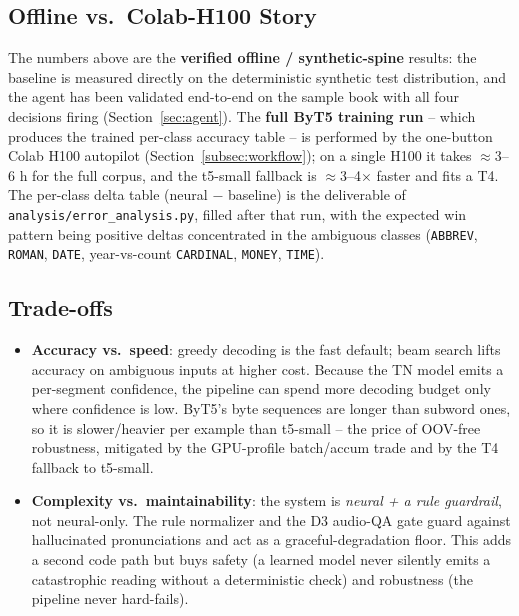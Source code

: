 \documentclass[12pt,a4paper]{article}
\begin{document}
\subsection{Offline vs.\ Colab-H100 Story}

The numbers above are the \textbf{verified offline / synthetic-spine} results: the baseline is measured directly on the deterministic synthetic test distribution, and the agent has been validated end-to-end on the sample book with all four decisions firing (Section~\ref{sec:agent}). The \textbf{full ByT5 training run} -- which produces the trained per-class accuracy table -- is performed by the one-button Colab H100 autopilot (Section~\ref{subsec:workflow}); on a single H100 it takes $\approx$3--6 h for the full corpus, and the t5-small fallback is $\approx$3--4$\times$ faster and fits a T4. The per-class delta table (neural $-$ baseline) is the deliverable of \texttt{analysis/error\_analysis.py}, filled after that run, with the expected win pattern being positive deltas concentrated in the ambiguous classes (\texttt{ABBREV}, \texttt{ROMAN}, \texttt{DATE}, year-vs-count \texttt{CARDINAL}, \texttt{MONEY}, \texttt{TIME}).

\subsection{Trade-offs}

\begin{itemize}\setlength\itemsep{0.15em}
  \item \textbf{Accuracy vs.\ speed}: greedy decoding is the fast default; beam search lifts accuracy on ambiguous inputs at higher cost. Because the TN model emits a per-segment confidence, the pipeline can spend more decoding budget only where confidence is low. ByT5's byte sequences are longer than subword ones, so it is slower/heavier per example than t5-small -- the price of OOV-free robustness, mitigated by the GPU-profile batch/accum trade and by the T4 fallback to t5-small.
  \item \textbf{Complexity vs.\ maintainability}: the system is \emph{neural + a rule guardrail}, not neural-only. The rule normalizer and the D3 audio-QA gate guard against hallucinated pronunciations and act as a graceful-degradation floor. This adds a second code path but buys safety (a learned model never silently emits a catastrophic reading without a deterministic check) and robustness (the pipeline never hard-fails).
\end{itemize}
\end{document}

